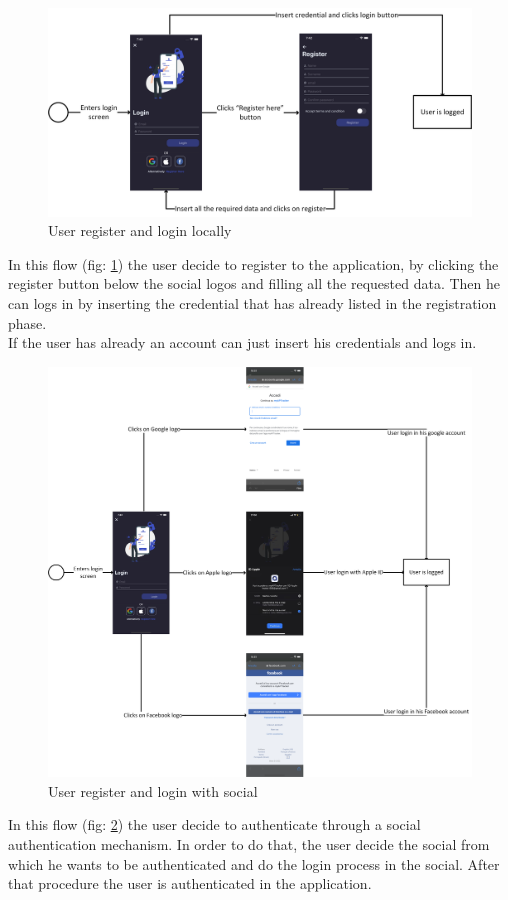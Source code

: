 \begin{figure}[h!]
        \centering
        \includegraphics[scale=0.14]{images/interfaces/user_login_interface.png}
        \caption{User register and login locally}
        \label{fig:user_sign_up_and_login}
\end{figure}
\FloatBarrier
In this flow (fig: \ref{fig:user_sign_up_and_login}) the user decide to register to the application, by clicking the register button below the social logos and filling all the requested data. Then he can logs in by inserting the credential that has already listed in the registration phase.\\
If the user has already an account can just insert his credentials and logs in.

\begin{figure}[h!]
        \centering
        \includegraphics[scale=0.14]{images/interfaces/user_login_interface_social.png}
        \caption{User register and login with social}
        \label{fig:user_sign_up_and_login_social}
\end{figure}
\FloatBarrier
In this flow (fig: \ref{fig:user_sign_up_and_login_social}) the user decide to authenticate through a social authentication mechanism. In order to do that, the user decide the social from which he wants to be authenticated and do the login process in the social. After that procedure the user is authenticated in the application.

